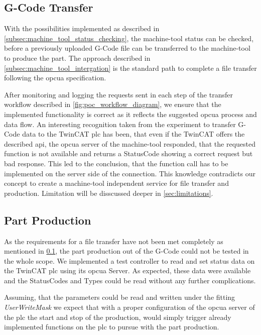 \documentclass[
a4paper,
twoside,
headsepline,
cleardoublepage=empty,
parskip=half,
draft=false
]{scrbook}
\begin{document}
			\subsection{G-Code Transfer}\label{subsec:g_code_transfer}

				With the possibilities implemented as described in \cref{subsec:machine_tool_status_checking}, the machine-tool status can be checked, before a previously uploaded G-Code file can be transferred to the machine-tool to produce the part. The approach described in \cref{subsec:machine_tool_intergation} is the standard path to complete a file transfer following the \gls{opcua} specification.

				After monitoring and logging the requests sent in each step of the transfer workflow described in \cref{fig:poc_workflow_diagram}, we ensure that the implemented functionality is correct as it reflects the suggested \gls{opcua} process and data flow. An interesting recognition taken from the experiment to transfer G-Code data to the TwinCAT \gls{plc} has been, that even if the TwinCAT offers the described \gls{api}, the \gls{opcua} server of the machine-tool responded, that the requested function is not available and returns a StatusCode showing a correct request but bad response. This led to the conclusion, that the function call has to be implemented on the server side of the connection. This knowledge contradicts our concept to create a machine-tool independent service for file transfer and production. Limitation will be disscussed deeper in \cref{sec:limitations}.

			\subsection{Part Production}\label{subsec:part_production}

				As the requirements for a file transfer have not been met completely as mentioned in \cref{subsec:g_code_transfer}, the part production out of the G-Code could not be tested in the whole scope. We implemented a test controller to read and set status data on the TwinCAT \gls{plc} using its \gls{opcua} Server. As expected, these data were available and the StatusCodes and Types could be read without any further complications.

				Assuming, that the parameters could be read and written under the fitting \textit{UserWriteMask} we expect that with a proper configuration of the \gls{opcua} server of the \gls{plc} the start and stop of the production, would simply trigger already implemented functions on the \gls{plc} to pursue with the part production.
\end{document}
